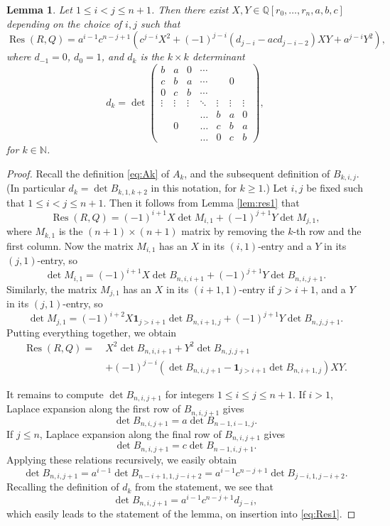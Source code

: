 \documentclass[reqno, 12pt, twoside]{amsart}
\numberwithin{equation}{section}
\DeclareMathOperator{\Res}{Res}
\newcommand{\Q}{\mathbb{Q}}
\newcommand{\0}{\mathbf{0}}
\newcommand{\NN}{\mathbb{N}}
\newtheorem{lemma}[theorem]{Lemma}
\theoremstyle{definition}
\renewcommand{\leq}{\leqslant}
\renewcommand{\geq}{\geqslant}
\begin{document}
\begin{lemma}\label{lem:res2}
Let $1\leq i<j\leq n+1$.
Then there exist $X,Y\in\Q[r_0,\dots, r_n,a,b,c]$ depending on the choice of $i,j$ such that 
\[
\Res(R,Q)
=a^{i-1}c^{n-j+1}\left(c^{j-i}X^2+(-1)^{j-i}(d_{j-i}-acd_{j-i-2})XY+a^{j-i}Y^2\right),
\]
where 
$d_{-1}=0$,  $d_0=1$, and $d_k$ is the $k\times k$ determinant 
\[d_k=\det
\begin{pmatrix}
b & a & 0& \cdots  & &  & \\
c & b& a&  \cdots & &  0&\\
0 & c& b& \cdots &  &  & \\
\vdots & \vdots &\vdots & \ddots  &\vdots &\vdots &\vdots \\ 
   &    &  & \dots& b& a&  0\\
   & 0  &   &\dots& c& b&  a\\
   &    &  &\dots & 0& c&  b
\end{pmatrix},
\]
for $k\in \NN$.
\end{lemma}


\begin{proof}
Recall the definition \eqref{eq:Ak} of $A_k$, 
and the subsequent definition of $B_{k,i,j}$.
(In particular $d_k=\det B_{k,1,k+2}$ in this notation, for $k\geq 1$.)
 Let $i,j$ be fixed such that  $1\leq i<j\leq n+1$. Then 
it follows from Lemma \ref{lem:res1} that 
\[
\Res(R,Q)=(-1)^{i+1}X\det M_{i,1}+(-1)^{j+1}Y\det M_{j,1},
\]
where $M_{k,1}$ is the $(n+1)\times(n+1)$ matrix by removing the $k$-th row and the first column.
Now the matrix $M_{i,1}$ has an $X$ in its $(i,1)$-entry and a $Y$ in its $(j,1)$-entry, so
\[\det M_{i,1}=(-1)^{i+1}X\det B_{n,i,i+1}+(-1)^{j+1}Y\det B_{n,i,j+1}.\]
Similarly, 
the matrix $M_{j,1}$ has an $X$ in its $(i+1,1)$-entry if $j>i+1$, and a $Y$ in its $(j,1)$-entry, so
\[\det M_{j,1}=(-1)^{i+2}X\mathbf{1}_{j> i+1}\det B_{n,i+1,j}+(-1)^{j+1} Y\det B_{n,j,j+1}.\]
Putting everything together, we obtain
\begin{equation}\label{eq:Res1}
\begin{split}
\Res(R,Q)
=~&
X^2\det B_{n,i,i+1}
+Y^2 \det B_{n,j,j+1}\\
&+(-1)^{j-i}\left(\det B_{n,i,j+1}-\mathbf{1}_{j> i+1}\det B_{n,i+1,j}\right)XY.
\end{split}
\end{equation}


It remains to compute $\det B_{n,i,j+1}$ for 
 integers $1\leq i\leq j\leq n+1$. 
If $i>1$,  Laplace expansion along the first row of $B_{n,i,j+1}$ gives
\[ \det B_{n,i,j+1}=a\det B_{n-1,i-1,j}.\]
If $j\leq n$, Laplace expansion along the final row of $B_{n,i,j+1}$ gives
\[ \det B_{n,i,j+1}=c\det B_{n-1,i,j+1}.\]
Applying these relations recursively, we easily obtain
\[ \det B_{n,i,j+1}
=a^{i-1}\det B_{n-i+1,1,j-i+2}
=a^{i-1}c^{n-j+1}
\det B_{j-i,1,j-i+2}.
\]
Recalling the definition of $d_k$ from the statement, 
we see that 
\[\det B_{n,i,j+1}=a^{i-1}c^{n-j+1}d_{j-i},
\]
which  easily leads to the statement of the lemma, on insertion into  \eqref{eq:Res1}.
\end{proof}
\end{document}
